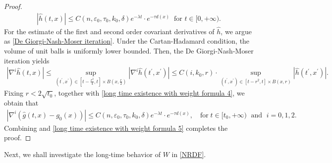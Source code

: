 \documentclass[12pt]{amsart}
\begin{document}
\begin{proof}
\begin{align}
    |\hat{h}(t, x)| \leq C(n,\varepsilon_0,\tau_0, k_0, \delta) e^{-\lambda t}\cdot e^{-\tau d(x)}\;\; \text{for } t\in [0, +\infty). 
\end{align}
For the estimate of the first and second order covariant derivatives of $\hat{h}$, we argue as \eqref{De Giorgi-Nash-Moser iteration}. Under the Cartan-Hadamard condition, the volume of unit balls is uniformly lower bounded. Then, the De Giorgi-Nash-Moser iteration yields 
    \begin{align}\label{De Giorgi-Nash-Moser iteration 2} 
        |\nabla^{i}\hat{h}(t, x)|\leq\sup_{(t^{\prime}, x^{\prime})\in [t - \frac{r^2}{4}, t]\times B(x, \frac{r}{2})}|\nabla^i \hat{h}(t^{\prime}, x^{\prime})|\leq C(i, k_0, r)\cdot \sup_{(t^{\prime}, x^{\prime})\in [t - r^2, t]\times B(x, r)}|\hat{h}(t^{\prime}, x^{\prime})|. 
    \end{align}
Fixing $r < 2\sqrt{t_0}$, together with \eqref{long time existence with weight formula 4}, we obtain that 
\begin{align}\label{long time existence with weight formula 5}
    |\nabla^i(\hat{g}(t,x) - g_0(x))| \leq C(n,\varepsilon_0,\tau_0, k_0, \delta) e^{-\lambda t}\cdot e^{-\tau d(x)},\quad \text{for}\; t\in [t_0, +\infty)\; \text{ and }\; i = 0, 1, 2.
\end{align}
Combining  and \eqref{long time existence with weight formula 5} completes the proof.
\end{proof}

Next, we shall investigate the long-time behavior of $W$ in \eqref{NRDF}. 
\end{document}
